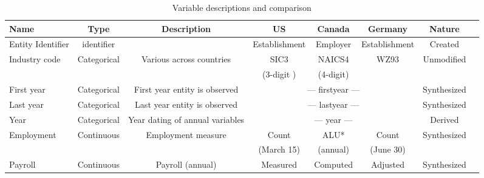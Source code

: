 \begin{table}[H]
  \centering\footnotesize
  \caption{Variable descriptions and comparison}  \label{tab:common_Variable} \medskip
  \renewcommand{\arraystretch}{1}
 \setlength{\tabcolsep}{4.5pt}
 \begin{tabular}{l  c c c c c c c}
    \toprule
    \textbf{Name}&\textbf{Type} &\textbf{Description} &\textbf{US} & \textbf{Canada} &\textbf{Germany} &\textbf{Nature}\\
    \midrule
Entity Identifier& identifier& & Establishment & Employer & Establishment &Created\\
Industry code&Categorical& Various across countries &SIC3 & NAICS4 & WZ93 &Unmodified\\
             &           &                          &(3-digit )& (4-digit) &  &\\
First year&Categorical&First year entity is observed &\multicolumn{3}{c}{--- firstyear ---}&Synthesized\\
Last year&Categorical&Last year entity is observed &\multicolumn{3}{c}{--- lastyear ---}&Synthesized\\
Year&Categorical&Year dating of annual variables&\multicolumn{3}{c}{--- year ---}&Derived\\
Employment & Continuous & Employment measure & Count & ALU* & Count & Synthesized \\
            &            &                    & (March 15) &(annual)& (June 30)&\\
Payroll&Continuous&  Payroll (annual)& Measured & Computed & Adjusted &Synthesized\\
   \bottomrule
  \end{tabular} 
\end{table}